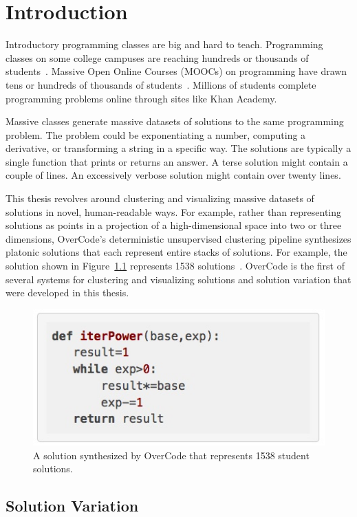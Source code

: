 \chapter{Introduction}\label{chapter:introduction}

Introductory programming classes are big and hard to teach. Programming classes on some college campuses are reaching hundreds or thousands of students~\cite{biggestClass}. Massive Open Online Courses (MOOCs) on programming have drawn tens or hundreds of thousands of students~\cite{codewebs}. Millions of students complete programming problems online through sites like Khan Academy.

Massive classes generate massive datasets of solutions to the same programming problem. The problem could be exponentiating a number, computing a derivative, or transforming a string in a specific way. The solutions are typically a single function that prints or returns an answer. A terse solution might contain a couple of lines. An excessively verbose solution might contain over twenty lines.

This thesis revolves around clustering and visualizing massive datasets of solutions in novel, human-readable ways. For example, rather than representing solutions as points in a projection of a high-dimensional space into two or three dimensions, OverCode's deterministic unsupervised clustering pipeline synthesizes platonic solutions that each represent entire stacks of solutions. For example, the solution shown in Figure~\ref{largestStack} represents 1538 solutions~\cite{overcode}. OverCode is the first of several systems for clustering and visualizing solutions and solution variation that were developed in this thesis.

\begin{figure}
\centering
\includegraphics[width=0.5\linewidth]{Body/figures/overcode/largest_stack_cropped.jpg}
\caption{A solution synthesized by OverCode that represents 1538 student solutions.}
\label{largestStack}
\end{figure}

\section{Solution Variation}

